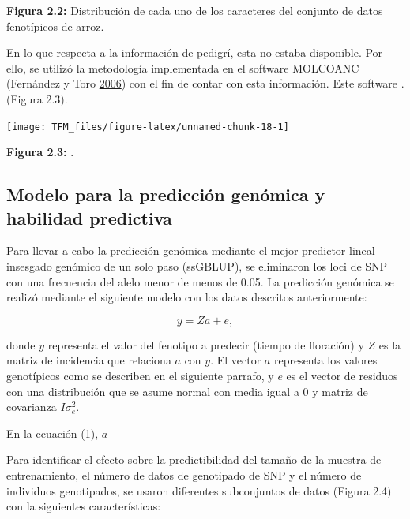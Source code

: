 \documentclass[11pt,spanish,a4paper,oneside,]{book} %
\begin{document}
\begin{center}
\textbf{Figura 2.2:} Distribución de cada uno de los caracteres del conjunto de datos fenotípicos de arroz.

\end{center}

En lo que respecta a la información de pedigrí, esta no estaba disponible. Por ello, se utilizó la metodología implementada en el software MOLCOANC (Fernández y Toro \protect\hyperlink{ref-cite:24}{2006}) con el fin de contar con esta información. Este software . (Figura 2.3).

\begin{center}\texttt{[image: TFM\_files/figure-latex/unnamed-chunk-18-1]} \end{center}

\begin{center}
\textbf{Figura 2.3:} .

\end{center}

\hypertarget{modelo-para-la-predicciuxf3n-genuxf3mica-y-habilidad-predictiva}{%
\subsection{Modelo para la predicción genómica y habilidad predictiva}\label{modelo-para-la-predicciuxf3n-genuxf3mica-y-habilidad-predictiva}}

Para llevar a cabo la predicción genómica mediante el mejor predictor lineal insesgado genómico de un solo paso (ssGBLUP), se eliminaron los loci de SNP con una frecuencia del alelo menor de menos de 0.05. La predicción genómica se realizó mediante el siguiente modelo con los datos descritos anteriormente:

\begin{equation}
y = Za + e,
\end{equation}

donde \(y\) representa el valor del fenotipo a predecir (tiempo de floración) y \(Z\) es la matriz de incidencia que relaciona \(a\) con \(y\). El vector \(a\) representa los valores genotípicos como se describen en el siguiente parrafo, y \(e\) es el vector de residuos con una distribución que se asume normal con media igual a \(0\) y matriz de covarianza \(I\sigma^{2}_{e}\).

En la ecuación (1), \(a\)

Para identificar el efecto sobre la predictibilidad del tamaño de la muestra de entrenamiento, el número de datos de genotipado de SNP y el número de individuos genotipados, se usaron diferentes subconjuntos de datos (Figura 2.4) con la siguientes características:
\end{document}
